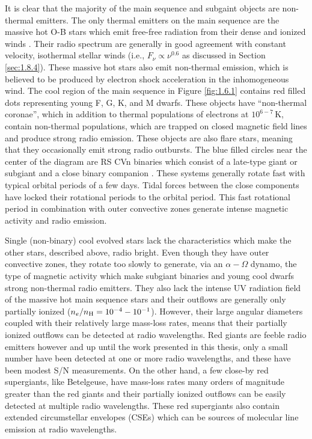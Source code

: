 It is clear that the majority of the main sequence and subgaint objects are non-thermal emitters. The only thermal emitters on the main sequence are the massive hot O-B stars which emit free-free radiation from their dense and ionized winds \cite[e.g.,][]{scuderi_1998}. Their radio spectrum are generally in good agreement with constant velocity, isothermal stellar winds (i.e., $F_{\nu} \propto \nu ^{0.6}$ as discussed in Section \ref{sec:1.8.4}). These massive hot stars also emit non-thermal emission, which is believed to be produced by electron shock acceleration in the inhomogeneous wind. The cool region of the main sequence in Figure \ref{fig:1.6.1} contains red filled dots representing young F, G, K, and M dwarfs. These objects have ``non-thermal coronae'', which in addition to thermal populations of electrons at $10^{6-7}$\,K, contain non-thermal populations, which are trapped on closed magnetic field lines and produce strong radio emission. These objects are also flare stars, meaning that they occasionally emit strong radio outbursts. The blue filled circles near the center of the diagram are RS CVn binaries which consist of a late-type giant or subgiant and a close binary companion \citep{strassmeier_1993}. These systems generally rotate fast with typical orbital periods of a few days. Tidal forces between the close components have locked  their rotational periods to the orbital period. This fast rotational period in combination with outer convective zones generate intense magnetic activity and radio emission. 

Single (non-binary) cool evolved stars lack the characteristics which make the other stars, described above, radio bright. Even though they have outer convective zones, they rotate too slowly to generate, via an $\alpha - \Omega$ dynamo, the type of magnetic activity which make subgiant binaries and young cool dwarfs strong non-thermal radio emitters. They also lack the intense UV radiation field of the massive hot main sequence stars and their outflows are generally only partially ionized ($n_{e}/n_{\rm{H}} = 10^{-4} - 10^{-1}$). However, their large angular diameters coupled with their relatively large mass-loss rates, means that their partially ionized outflows can be detected at radio wavelengths. Red giants are feeble radio emitters however and up until the work presented in this thesis, only a small number have been detected at one or more radio wavelengths, and these have been modest S/N measurements. On the other hand, a few close-by red supergiants, like Betelgeuse, have mass-loss rates many orders of magnitude greater than the red giants and their partially ionized outflows can be easily detected at multiple radio wavelengths. These red supergiants also contain extended circumstellar envelopes (CSEs) which can be  sources of molecular line emission at radio wavelengths. 

